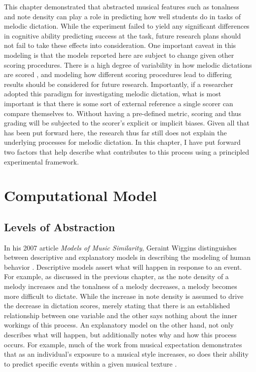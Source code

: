 \documentclass[12pt,]{book}
\begin{document}
This chapter demonstrated that abstracted musical features such as tonalness and note density can play a role in predicting how well students do in tasks of melodic dictation.
While the experiment failed to yield any significant differences in cognitive ability predicting success at the task, future research plans should not fail to take these effects into consideration.
One important caveat in this modeling is that the models reported here are subject to change given other scoring procedures.
There is a high degree of variability in how melodic dictations are scored \citep{gillespieMelodicDictationScoring2001}, and modeling how different scoring procedures lead to differing results should be considered for future research.
Importantly, if a researcher adopted this paradigm for investigating melodic dictation, what is most important is that there is some sort of external reference a single scorer can compare themselves to.
Without having a pre-defined metric, scoring and thus grading will be subjected to the scorer's explicit or implicit biases.
Given all that has been put forward here, the research thus far still does not explain the underlying processes for melodic dictation.
In this chapter, I have put forward two factors that help describe what contributes to this process using a principled experimental framework.

\clearpage

\hypertarget{computational-model}{%
\chapter{Computational Model}\label{computational-model}}

\hypertarget{levels-of-abstraction}{%
\section{Levels of Abstraction}\label{levels-of-abstraction}}

In his 2007 article \emph{Models of Music Similarity}, Geraint Wiggins distinguishes between descriptive and explanatory models in describing the modeling of human behavior \citep{wigginsModelsMusicalSimilarity2007}.
Descriptive models assert what will happen in response to an event.
For example, as discussed in the previous chapter, as the note density of a melody increases and the tonalness of a melody decreases, a melody becomes more difficult to dictate.
While the increase in note density is assumed to drive the decrease in dictation scores, merely stating that there is an established relationship between one variable and the other says nothing about the inner workings of this process.
An explanatory model on the other hand, not only describes what will happen, but additionally notes why and how this process occurs.
For example, much of the work from musical expectation demonstrates that as an individual's exposure to a musical style increases, so does their ability to predict specific events within a given musical texture \citep{pearceStatisticalLearningProbabilistic2018a}.
\end{document}
